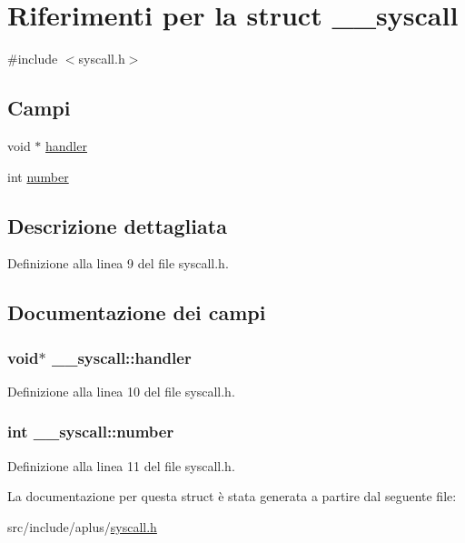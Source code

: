 \hypertarget{struct____syscall}{\section{Riferimenti per la struct \+\_\+\+\_\+syscall}
\label{struct____syscall}
}


{\ttfamily \#include $<$syscall.\+h$>$}

\subsection*{Campi}
\begin{DoxyCompactItemize}
\item 
void $\ast$ \hyperlink{struct____syscall_af1d75ee98d8568f74e8421654a1081d3}{handler}
\item 
int \hyperlink{struct____syscall_a7f020a41ed9bf3daff3dfc46ee673eef}{number}
\end{DoxyCompactItemize}


\subsection{Descrizione dettagliata}


Definizione alla linea 9 del file syscall.\+h.



\subsection{Documentazione dei campi}
\hypertarget{struct____syscall_af1d75ee98d8568f74e8421654a1081d3}{
\subsubsection[{handler}]{\setlength{\rightskip}{0pt plus 5cm}void$\ast$ \+\_\+\+\_\+syscall\+::handler}}\label{struct____syscall_af1d75ee98d8568f74e8421654a1081d3}


Definizione alla linea 10 del file syscall.\+h.

\hypertarget{struct____syscall_a7f020a41ed9bf3daff3dfc46ee673eef}{
\subsubsection[{number}]{\setlength{\rightskip}{0pt plus 5cm}int \+\_\+\+\_\+syscall\+::number}}\label{struct____syscall_a7f020a41ed9bf3daff3dfc46ee673eef}


Definizione alla linea 11 del file syscall.\+h.



La documentazione per questa struct è stata generata a partire dal seguente file\+:\begin{DoxyCompactItemize}
\item 
src/include/aplus/\hyperlink{syscall_8h}{syscall.\+h}\end{DoxyCompactItemize}
